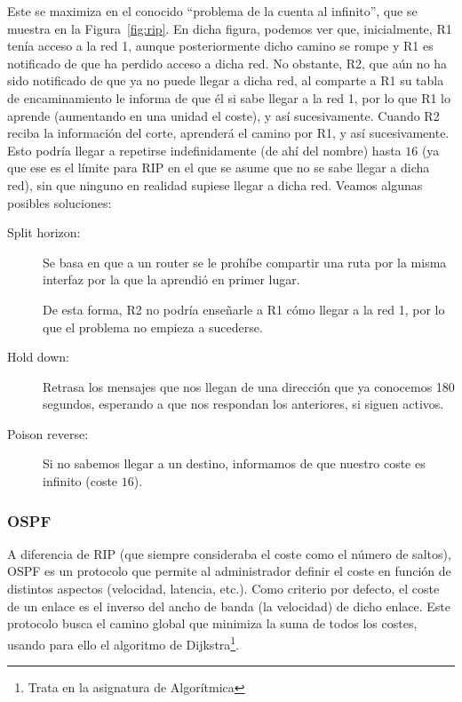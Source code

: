 Este se maximiza en el conocido ``problema de la cuenta al infinito'', que se muestra en la Figura~\ref{fig:rip}. En dicha figura, podemos ver que, inicialmente, R1 tenía acceso a la red 1, aunque posteriormente dicho camino se rompe y R1 es notificado de que ha perdido acceso a dicha red. No obstante, R2, que aún no ha sido notificado de que ya no puede llegar a dicha red, al comparte a R1 su tabla de encaminamiento le informa de que él si sabe llegar a la red 1, por lo que R1 lo aprende (aumentando en una unidad el coste), y así sucesivamente. Cuando R2 reciba la información del corte, aprenderá el camino por R1, y así sucesivamente. Esto podría llegar a repetirse indefinidamente (de ahí del nombre) hasta $16$ (ya que ese es el límite para \acrshort{RIP} en el que se asume que no se sabe llegar a dicha red), sin que ninguno en realidad supiese llegar a dicha red. Veamos algunas posibles soluciones:
\begin{description}
    \item [Split horizon:] Se basa en que a un router se le prohíbe compartir una ruta por la misma interfaz por la que la aprendió en primer lugar.
    
    De esta forma, R2 no podría enseñarle a R1 cómo llegar a la red 1, por lo que el problema no empieza a sucederse.
    \item [Hold down:] Retrasa los mensajes que nos llegan de una dirección que ya conocemos 180 segundos, esperando a que nos respondan los anteriores, si siguen activos. 
    \item [Poison reverse:] Si no sabemos llegar a un destino, informamos de que nuestro coste es infinito (coste $16$).
\end{description}

\subsubsection{\acrfull{OSPF}}

A diferencia de \acrshort{RIP} (que siempre consideraba el coste como el número de saltos), \acrshort{OSPF} es un protocolo que permite al administrador definir el coste en función de distintos aspectos (velocidad, latencia, etc.).
Como criterio por defecto, el coste de un enlace es el inverso del ancho de banda (la velocidad) de dicho enlace. Este protocolo busca el camino global que minimiza la suma de todos los costes, usando para ello el algoritmo de Dijkstra\footnote{Trata en la asignatura de Algorítmica}.\\

